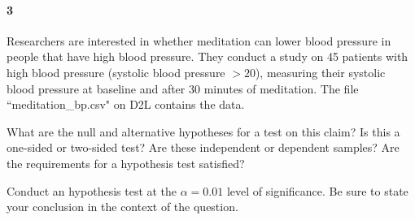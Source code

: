 \documentclass{article}
\begin{document}
\begin{flushleft}
\newpage
\paragraph{3} Researchers are interested in whether meditation can lower blood pressure in people that have high blood pressure. They conduct a study on 45 patients with high blood pressure (systolic blood pressure $> 20$), measuring their systolic blood pressure at baseline and after 30 minutes of meditation. The file ``meditation\_bp.csv" on D2L contains the data.
\begin{enumalpha}
\item What are the null and alternative hypotheses for a test on this claim? Is this a one-sided or two-sided test? Are these independent or dependent samples? Are the requirements for a hypothesis test satisfied?
\vspace{2.25in}
\item Conduct an hypothesis test at the $\alpha = 0.01$ level of significance. Be sure to state your conclusion in the context of the question.
\vspace{2.25in}
\end{enumalpha}



\end{flushleft}
\end{document}
